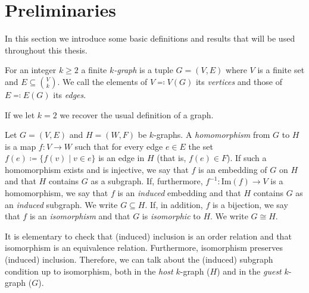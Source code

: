 \section{Preliminaries}\label{sec:preliminaries}
In this section we introduce some basic definitions and results that will be used throughout this thesis.

\begin{definition}

    For an integer $k \geq 2$ a finite \emph{$k$-graph}
    is a tuple $G = (V, E)$ where $V$ is a finite set
    and $E \subseteq \binom{V}{k}$.
    We call the elements of $V \eqqcolon V(G)$ its \emph{vertices}
    and those of $E \eqqcolon E(G)$ its \emph{edges}.
\end{definition}

\begin{remark}
    If we let $k=2$ we recover the usual definition of a graph.
\end{remark}


\begin{definition}
    Let $G = (V, E)$ and $H = (W, F)$ be $k$-graphs.
    A \emph{homomorphism} from $G$ to $H$ is a map $f: V \to W$
    such that for every edge $e \in E$ the set $f(e) \coloneqq \{f(v) \mid v \in e\}$
    is an edge in $H$ (that is, $f(e) \in F$). If such a homomorphism exists
    and is injective, we say that $f$ is an embedding of $G$ on $H$
    and that $H$ contains $G$ as a subgraph.
    If, furthermore, $f^{-1}: \text{Im}(f) \to V$ is a homomorphism, we say that $f$
    is an \emph{induced} embedding and that $H$ contains $G$ as an \emph{induced}
    subgraph.
    We write $G \subseteq H$.
    If, in addition, $f$ is a bijection, we say that $f$ is an \emph{isomorphism}
    and that $G$ is \emph{isomorphic} to $H$.
    We write $G \cong H$.
\end{definition}

\begin{remark} %

    It is elementary to check that
    (induced) inclusion is an order relation and that
    isomorphism is an equivalence relation.
    Furthermore, isomorphism preserves (induced) inclusion.
    Therefore, we can talk about the (induced) subgraph
    condition up to isomorphism, both in the \emph{host} $k$-graph
    ($H$) and in the \emph{guest} $k$-graph ($G$).
\end{remark}

